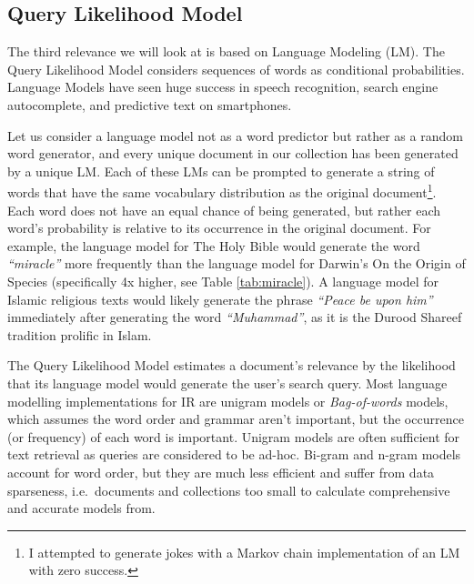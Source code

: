 

\subsection{Query Likelihood Model}
The third relevance we will look at is based on Language Modeling (LM). The Query Likelihood Model considers sequences of words as conditional probabilities. Language Models have seen huge success in speech recognition, search engine autocomplete, and predictive text on smartphones. 

Let us consider a language model not as a word predictor but rather as a random word generator, and every unique document in our collection has been generated by a unique LM. Each of these LMs can be prompted to generate a string of words that have the same vocabulary distribution as the original document\footnote{I attempted to generate jokes with a Markov chain implementation of an LM with zero success.}. Each word does not have an equal chance of being generated, but rather each word's probability is relative to its occurrence in the original document. For example, the language model for The Holy Bible would generate the word \textit{``miracle''} more frequently than the language model for Darwin's On the Origin of Species (specifically 4x higher, see Table \ref{tab:miracle}). A language model for Islamic religious texts would likely generate the phrase \textit{``Peace be upon him''} immediately after generating the word \textit{``Muhammad''}, as it is the Durood Shareef tradition prolific in Islam. 

The Query Likelihood Model estimates a document's relevance by the likelihood that its language model would generate the user's search query. Most language modelling implementations for IR are unigram models or \textit{Bag-of-words} models, which assumes the word order and grammar aren't important, but the occurrence (or frequency) of each word is important. Unigram models are often sufficient for text retrieval as queries are considered to be ad-hoc. Bi-gram and n-gram models account for word order, but they are much less efficient and suffer from data sparseness, i.e.\ documents and collections too small to calculate comprehensive and accurate models from.

